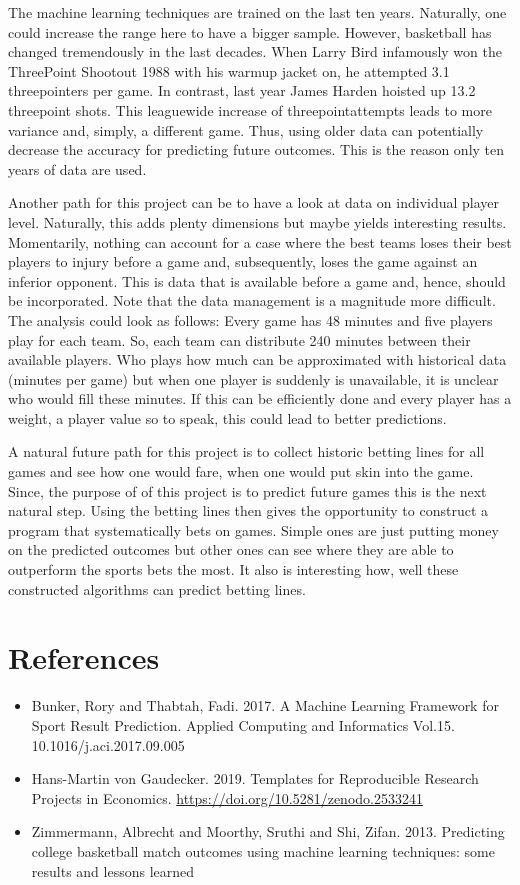 \documentclass[11pt,a4paper,leqno]{article}
\begin{document}
The machine learning techniques are trained on the last ten years. Naturally, one could increase the range here to have a bigger sample. However, basketball has changed tremendously in the last decades. When Larry Bird infamously won the Three\-Point Shootout 1988 with his warm\-up jacket on, he attempted 3.1 three\-pointers per game. In contrast, last year James Harden hoisted up 13.2 three\-point shots. This league\-wide increase of three\-point\-attempts leads to more variance and, simply, a different game. Thus, using older data can potentially decrease the accuracy for predicting future outcomes. This is the reason only ten years of data are used.

Another path for this project can be to have a look at data on individual player level. Naturally, this adds plenty dimensions but maybe yields interesting results. Momentarily, nothing can account for a case where the best teams loses their best players to injury before a game and, subsequently, loses the game against an inferior opponent. This is data that is available before a game and, hence, should be incorporated. Note that the data management is a magnitude more difficult. The analysis could look as follows: Every game has 48 minutes and five players play for each team. So, each team can distribute 240 minutes between their available players. Who plays how much can be approximated with historical data (minutes per game) but when one player is suddenly is unavailable, it is unclear who would fill these minutes. If this can be efficiently done and every player has a weight, a player value so to speak, this could lead to better predictions.

A natural future path for this project is to collect historic betting lines for all games and see how one would fare, when one would put skin into the game. Since, the purpose of of this project is to predict future games this is the next natural step. Using the betting lines then gives the opportunity to construct a program that systematically bets on games. Simple ones are just putting money on the predicted outcomes but other ones can see where they are able to outperform the sports bets the most. It also is interesting how, well these constructed algorithms can predict betting lines.

\section{References}

\begin{itemize}
\setlength{\itemsep}{3em}
\item Bunker, Rory and Thabtah, Fadi. 2017. A Machine Learning Framework for Sport Result Prediction. Applied Computing and Informatics Vol.15. 10.1016/j.aci.2017.09.005
\item Hans-Martin von Gaudecker. 2019. Templates for Reproducible Research Projects in Economics. \url{https://doi.org/10.5281/zenodo.2533241}
\item Zimmermann, Albrecht and Moorthy, Sruthi and Shi, Zifan. 2013. Predicting college basketball match outcomes using machine learning techniques: some results and lessons learned
\end{itemize}

%

\end{document}
